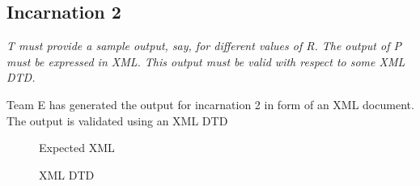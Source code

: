   \subsection{Incarnation 2}
  \begin{flushleft}
    \textit{T must provide a sample output, say, for different values of R. The output of P must be expressed in XML. This output must be valid with respect to some XML DTD.}
  \end{flushleft}
  \begin{flushleft}
    Team E has generated the output for incarnation 2 in form of an XML document. The output is validated using an XML DTD
  \end{flushleft}
  \begin{figure}[h!]
    \centering
    \caption{Expected XML}
    \label{fig:XML output}
  \end{figure}
  \begin{figure}[h!]
    \centering
    \caption{XML DTD}
    \label{fig:XML DTD}
  \end{figure}
 